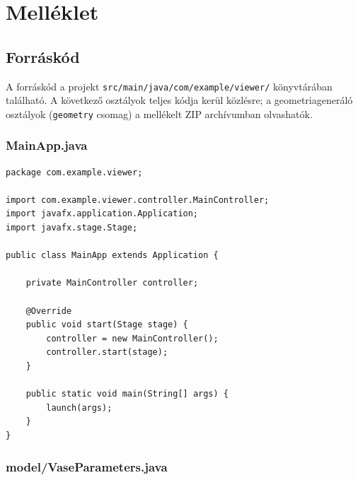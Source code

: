 \documentclass[12pt,a4paper]{article}
\newcommand{\code}[1]{\texttt{#1}}
\begin{document}
\section{Melléklet}

\subsection{Forráskód}

A forráskód a projekt \code{src/main/java/com/example/viewer/} könyvtárában
található. A következő osztályok teljes kódja kerül közlésre; a geometriageneráló
osztályok (\code{geometry} csomag) a mellékelt ZIP archívumban olvashatók.

\subsubsection*{MainApp.java}

\begin{lstlisting}[style=java, caption={MainApp.java -- belépési pont}]
package com.example.viewer;

import com.example.viewer.controller.MainController;
import javafx.application.Application;
import javafx.stage.Stage;

public class MainApp extends Application {

    private MainController controller;

    @Override
    public void start(Stage stage) {
        controller = new MainController();
        controller.start(stage);
    }

    public static void main(String[] args) {
        launch(args);
    }
}
\end{lstlisting}

\subsubsection*{model/VaseParameters.java}
\end{document}
